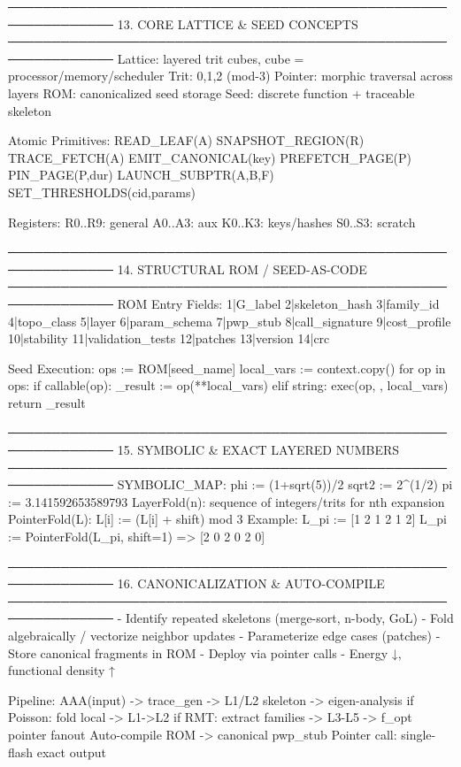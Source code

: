 ──────────────────────────────────────────────────────────────
13. CORE LATTICE & SEED CONCEPTS
──────────────────────────────────────────────────────────────
Lattice: layered trit cubes, cube = processor/memory/scheduler
Trit: {0,1,2} (mod-3)
Pointer: morphic traversal across layers
ROM: canonicalized seed storage
Seed: discrete function + traceable skeleton

Atomic Primitives:
  READ_LEAF(A)
  SNAPSHOT_REGION(R)
  TRACE_FETCH(A)
  EMIT_CANONICAL(key)
  PREFETCH_PAGE(P)
  PIN_PAGE(P,dur)
  LAUNCH_SUBPTR(A,B,F)
  SET_THRESHOLDS(cid,params)

Registers:
  R0..R9: general
  A0..A3: aux
  K0..K3: keys/hashes
  S0..S3: scratch

──────────────────────────────────────────────────────────────
14. STRUCTURAL ROM / SEED-AS-CODE
──────────────────────────────────────────────────────────────
ROM Entry Fields:
  1|G_label
  2|skeleton_hash
  3|family_id
  4|topo_class
  5|layer
  6|param_schema
  7|pwp_stub
  8|call_signature
  9|cost_profile
 10|stability
 11|validation_tests
 12|patches
 13|version
 14|crc

Seed Execution:
  ops := ROM[seed_name]
  local_vars := context.copy()
  for op in ops:
      if callable(op): _result := op(**local_vars)
      elif string: exec(op, {}, local_vars)
  return _result

──────────────────────────────────────────────────────────────
15. SYMBOLIC & EXACT LAYERED NUMBERS
──────────────────────────────────────────────────────────────
SYMBOLIC_MAP:
  phi := (1+sqrt(5))/2
  sqrt2 := 2^(1/2)
  pi := 3.141592653589793
LayerFold(n): sequence of integers/trits for nth expansion
PointerFold(L): L[i] := (L[i] + shift) mod 3
Example:
  L_pi := [1 2 1 2 1 2]
  L_pi := PointerFold(L_pi, shift=1) => [2 0 2 0 2 0]

──────────────────────────────────────────────────────────────
16. CANONICALIZATION & AUTO-COMPILE
──────────────────────────────────────────────────────────────
- Identify repeated skeletons (merge-sort, n-body, GoL)
- Fold algebraically / vectorize neighbor updates
- Parameterize edge cases (patches)
- Store canonical fragments in ROM
- Deploy via pointer calls
- Energy ↓, functional density ↑

Pipeline:
  AAA(input) -> trace_gen -> L1/L2 skeleton -> eigen-analysis
  if Poisson: fold local -> L1->L2
  if RMT: extract families -> L3-L5 -> f_opt pointer fanout
  Auto-compile ROM -> canonical pwp_stub
  Pointer call: single-flash exact output

